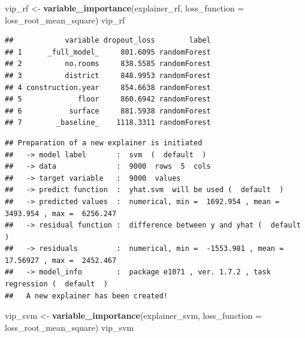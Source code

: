 \documentclass[12pt,]{krantz}
\newenvironment{Shaded}{\begin{snugshade}}{\end{snugshade}}
\newcommand{\DataTypeTok}[1]{\textcolor[rgb]{0.13,0.29,0.53}{#1}}
\newcommand{\DecValTok}[1]{\textcolor[rgb]{0.00,0.00,0.81}{#1}}
\newcommand{\KeywordTok}[1]{\textcolor[rgb]{0.13,0.29,0.53}{\textbf{#1}}}
\newcommand{\NormalTok}[1]{#1}
\newcommand{\OperatorTok}[1]{\textcolor[rgb]{0.81,0.36,0.00}{\textbf{#1}}}
\newcommand{\OtherTok}[1]{\textcolor[rgb]{0.56,0.35,0.01}{#1}}
\newcommand{\StringTok}[1]{\textcolor[rgb]{0.31,0.60,0.02}{#1}}
\begin{document}
\begin{Shaded}
\begin{Highlighting}[]
\NormalTok{vip_rf <-}\StringTok{ }\KeywordTok{variable_importance}\NormalTok{(explainer_rf, }
            \DataTypeTok{loss_function =}\NormalTok{ loss_root_mean_square)}
\NormalTok{vip_rf}
\end{Highlighting}
\end{Shaded}

\begin{verbatim}
##            variable dropout_loss        label
## 1      _full_model_     801.6095 randomForest
## 2          no.rooms     838.5585 randomForest
## 3          district     848.9953 randomForest
## 4 construction.year     854.6638 randomForest
## 5             floor     860.6942 randomForest
## 6           surface     881.5938 randomForest
## 7        _baseline_    1118.3311 randomForest
\end{verbatim}

\begin{Shaded}
\end{Shaded}

\begin{verbatim}
## Preparation of a new explainer is initiated
##   -> model label       :  svm  (  default  )
##   -> data              :  9000  rows  5  cols 
##   -> target variable   :  9000  values 
##   -> predict function  :  yhat.svm  will be used (  default  )
##   -> predicted values  :  numerical, min =  1692.954 , mean =  3493.954 , max =  6256.247  
##   -> residual function :  difference between y and yhat (  default  )
##   -> residuals         :  numerical, min =  -1553.981 , mean =  17.56927 , max =  2452.467  
##   -> model_info        :  package e1071 , ver. 1.7.2 , task regression (  default  ) 
##   A new explainer has been created!
\end{verbatim}

\begin{Shaded}
\begin{Highlighting}[]
\NormalTok{vip_svm <-}\StringTok{ }\KeywordTok{variable_importance}\NormalTok{(explainer_svm, }
            \DataTypeTok{loss_function =}\NormalTok{ loss_root_mean_square)}
\NormalTok{vip_svm}
\end{Highlighting}
\end{Shaded}
\end{document}

